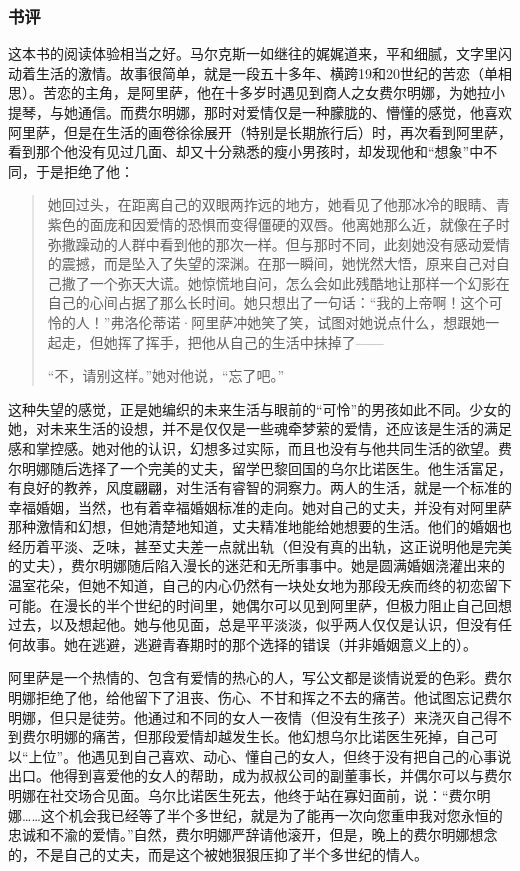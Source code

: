 \subsubsection{书评}

这本书的阅读体验相当之好。马尔克斯一如继往的娓娓道来，平和细腻，文字里闪动着生活的激情。故事很简单，就是一段五十多年、横跨19和20世纪的苦恋（单相思）。苦恋的主角，是阿里萨，他在十多岁时遇见到商人之女费尔明娜，为她拉小提琴，与她通信。而费尔明娜，那时对爱情仅是一种朦胧的、懵懂的感觉，他喜欢阿里萨，但是在生活的画卷徐徐展开（特别是长期旅行后）时，再次看到阿里萨，看到那个他没有见过几面、却又十分熟悉的瘦小男孩时，却发现他和“想象”中不同，于是拒绝了他：

\begin{quotation}
她回过头，在距离自己的双眼两拃远的地方，她看见了他那冰冷的眼睛、青紫色的面庞和因爱情的恐惧而变得僵硬的双唇。他离她那么近，就像在子时弥撒躁动的人群中看到他的那次一样。但与那时不同，此刻她没有感动爱情的震撼，而是坠入了失望的深渊。在那一瞬间，她恍然大悟，原来自己对自己撒了一个弥天大谎。她惊慌地自问，怎么会如此残酷地让那样一个幻影在自己的心间占据了那么长时间。她只想出了一句话：“我的上帝啊！这个可怜的人！”弗洛伦蒂诺·阿里萨冲她笑了笑，试图对她说点什么，想跟她一起走，但她挥了挥手，把他从自己的生活中抹掉了——

“不，请别这样。”她对他说，“忘了吧。”
\end{quotation}

这种失望的感觉，正是她编织的未来生活与眼前的“可怜”的男孩如此不同。少女的她，对未来生活的设想，并不是仅仅是一些魂牵梦萦的爱情，还应该是生活的满足感和掌控感。她对他的认识，幻想多过实际，而且也没有与他共同生活的欲望。费尔明娜随后选择了一个完美的丈夫，留学巴黎回国的乌尔比诺医生。他生活富足，有良好的教养，风度翩翩，对生活有睿智的洞察力。两人的生活，就是一个标准的幸福婚姻，当然，也有着幸福婚姻标准的走向。她对自己的丈夫，并没有对阿里萨那种激情和幻想，但她清楚地知道，丈夫精准地能给她想要的生活。他们的婚姻也经历着平淡、乏味，甚至丈夫差一点就出轨（但没有真的出轨，这正说明他是完美的丈夫），费尔明娜随后陷入漫长的迷茫和无所事事中。她是圆满婚姻浇灌出来的温室花朵，但她不知道，自己的内心仍然有一块处女地为那段无疾而终的初恋留下可能。在漫长的半个世纪的时间里，她偶尔可以见到阿里萨，但极力阻止自己回想过去，以及想起他。她与他见面，总是平平淡淡，似乎两人仅仅是认识，但没有任何故事。她在逃避，逃避青春期时的那个选择的错误（并非婚姻意义上的）。

阿里萨是一个热情的、包含有爱情的热心的人，写公文都是谈情说爱的色彩。费尔明娜拒绝了他，给他留下了沮丧、伤心、不甘和挥之不去的痛苦。他试图忘记费尔明娜，但只是徒劳。他通过和不同的女人一夜情（但没有生孩子）来浇灭自己得不到费尔明娜的痛苦，但那段爱情却越发生长。他幻想乌尔比诺医生死掉，自己可以“上位”。他遇见到自己喜欢、动心、懂自己的女人，但终于没有把自己的心事说出口。他得到喜爱他的女人的帮助，成为叔叔公司的副董事长，并偶尔可以与费尔明娜在社交场合见面。乌尔比诺医生死去，他终于站在寡妇面前，说：“费尔明娜……这个机会我已经等了半个多世纪，就是为了能再一次向您重申我对您永恒的忠诚和不渝的爱情。”自然，费尔明娜严辞请他滚开，但是，晚上的费尔明娜想念的，不是自己的丈夫，而是这个被她狠狠压抑了半个多世纪的情人。

